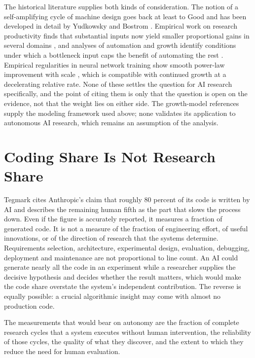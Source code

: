 \documentclass[11pt]{article}
\begin{document}
The historical literature supplies both kinds of consideration. The notion of a self-amplifying cycle of machine design goes back at least to Good \cite{Good1965} and has been developed in detail by Yudkowsky \cite{Yudkowsky2013} and Bostrom \cite{Bostrom2014}. Empirical work on research productivity finds that substantial inputs now yield smaller proportional gains in several domains \cite{Bloom2020}, and analyses of automation and growth identify conditions under which a bottleneck input caps the benefit of automating the rest \cite{Aghion2019}. Empirical regularities in neural network training show smooth power-law improvement with scale \cite{Kaplan2020}, which is compatible with continued growth at a decelerating relative rate. None of these settles the question for AI research specifically, and the point of citing them is only that the question is open on the evidence, not that the weight lies on either side. The growth-model references supply the modeling framework used above; none validates its application to autonomous AI research, which remains an assumption of the analysis.

\section{Coding Share Is Not Research Share}

Tegmark cites Anthropic's claim that roughly 80 percent of its code is written by AI and describes the remaining human fifth as the part that slows the process down. Even if the figure is accurately reported, it measures a fraction of generated code. It is not a measure of the fraction of engineering effort, of useful innovations, or of the direction of research that the systems determine. Requirements selection, architecture, experimental design, evaluation, debugging, deployment and maintenance are not proportional to line count. An AI could generate nearly all the code in an experiment while a researcher supplies the decisive hypothesis and decides whether the result matters, which would make the code share overstate the system's independent contribution. The reverse is equally possible: a crucial algorithmic insight may come with almost no production code.

The measurements that would bear on autonomy are the fraction of complete research cycles that a system executes without human intervention, the reliability of those cycles, the quality of what they discover, and the extent to which they reduce the need for human evaluation.
\end{document}
